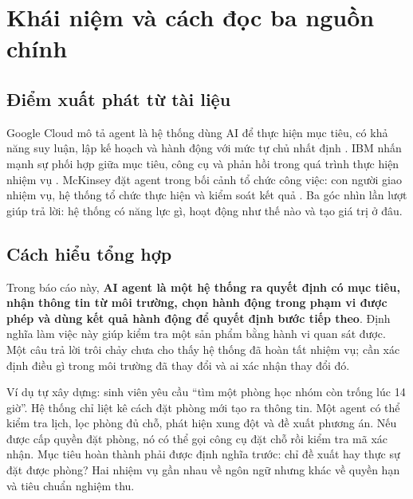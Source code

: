 \documentclass[12pt,a4paper]{article}
\begin{document}



\section{Khái niệm và cách đọc ba nguồn chính}
\subsection{Điểm xuất phát từ tài liệu}
Google Cloud mô tả agent là hệ thống dùng AI để thực hiện mục tiêu, có khả năng suy luận,
lập kế hoạch và hành động với mức tự chủ nhất định \cite{google}.
IBM nhấn mạnh sự phối hợp giữa mục tiêu, công cụ và phản hồi trong quá trình thực hiện
nhiệm vụ \cite{ibm}. McKinsey đặt agent trong bối cảnh tổ chức công việc: con người giao
nhiệm vụ, hệ thống tổ chức thực hiện và kiểm soát kết quả \cite{mckinsey}.
Ba góc nhìn lần lượt giúp trả lời: hệ thống có năng lực gì, hoạt động như thế nào và tạo
giá trị ở đâu.

\subsection{Cách hiểu tổng hợp}
Trong báo cáo này, \textbf{AI agent là một hệ thống ra quyết định có mục tiêu, nhận thông tin
từ môi trường, chọn hành động trong phạm vi được phép và dùng kết quả hành động để quyết
định bước tiếp theo}. Định nghĩa làm việc này giúp kiểm tra một sản phẩm bằng hành vi
quan sát được. Một câu trả lời trôi chảy chưa cho thấy hệ thống đã hoàn tất nhiệm vụ;
cần xác định điều gì trong môi trường đã thay đổi và ai xác nhận thay đổi đó.

Ví dụ tự xây dựng: sinh viên yêu cầu ``tìm một phòng học nhóm còn trống lúc 14 giờ''.
Hệ thống chỉ liệt kê cách đặt phòng mới tạo ra thông tin. Một agent có thể kiểm tra lịch,
lọc phòng đủ chỗ, phát hiện xung đột và đề xuất phương án. Nếu được cấp quyền đặt phòng,
nó có thể gọi công cụ đặt chỗ rồi kiểm tra mã xác nhận. Mục tiêu hoàn thành phải được
định nghĩa trước: chỉ đề xuất hay thực sự đặt được phòng? Hai nhiệm vụ gần nhau về ngôn
ngữ nhưng khác về quyền hạn và tiêu chuẩn nghiệm thu.
\end{document}

